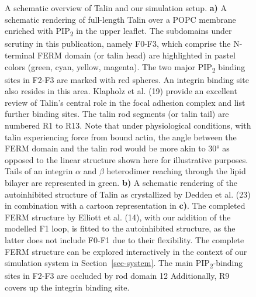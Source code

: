 \documentclass[
  letterpaper,
  DIV=11,
  numbers=noendperiod]{scrartcl}
\begin{document}
\begin{figure}
\begin{minipage}[t]{0.50\linewidth}
{\centering 


}

\subcaption{\label{fig-tln-align-autoinhib}~}
\end{minipage}%

\caption{\label{fig-structure}A schematic overview of Talin and our
simulation setup. \textbf{a)} A schematic rendering of full-length Talin
over a POPC membrane enriched with PIP\textsubscript{2} in the upper
leaflet. The subdomains under scrutiny in this publication, namely
F0-F3, which comprise the N-terminal FERM domain (or talin head) are
highlighted in pastel colors (green, cyan, yellow, magenta). The two
major PIP\textsubscript{2} binding sites in F2-F3 are marked with red
spheres. An integrin binding site also resides in this area. Klapholz et
al. (19) provide an excellent review of Talin's central role in the
focal adhesion complex and list further binding sites. The talin rod
segments (or talin tail) are numbered R1 to R13. Note that under
physiological conditions, with talin experiencing force from bound
actin, the angle between the FERM domain and the talin rod would be more
akin to 30° as opposed to the linear structure shown here for
illustrative purposes. Tails of an integrin \(\alpha\) and \(\beta\)
heterodimer reaching through the lipid bilayer are represented in green.
\textbf{b)} A schematic rendering of the autoinhibited structure of
Talin as crystallized by Dedden et al. (23) in combination with a
cartoon representation in \textbf{c)}. The completed FERM structure by
Elliott et al. (14), with our addition of the modelled F1 loop, is
fitted to the autoinhibited structure, as the latter does not include
F0-F1 due to their flexibility. The complete FERM structure can be
explored interactively in the context of our simulation system in
Section~\ref{sec-system}. The main PIP\textsubscript{2}-binding sites in
F2-F3 are occluded by rod domain 12 Additionally, R9 covers up the
integrin binding site.}

\end{figure}
\end{document}
